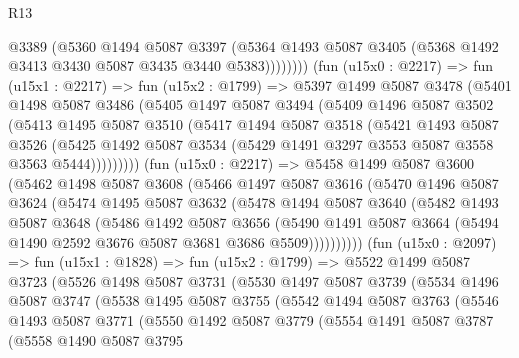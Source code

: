 \begin{lexlean}{R13}
\begin{coremodule}
              @3389
              (@5360
                @1494
                @5087
                @3397
                (@5364 @1493 @5087 @3405 (@5368 @1492 @3413 @3430 @5087 @3435 @3440 @5383))))))))
    (fun (u15x0 : @2217) =>
    fun (u15x1 : @2217) =>
    fun (u15x2 : @1799) =>
    @5397
      @1499
      @5087
      @3478
      (@5401
        @1498
        @5087
        @3486
        (@5405
          @1497
          @5087
          @3494
          (@5409
            @1496
            @5087
            @3502
            (@5413
              @1495
              @5087
              @3510
              (@5417
                @1494
                @5087
                @3518
                (@5421
                  @1493
                  @5087
                  @3526
                  (@5425 @1492 @5087 @3534 (@5429 @1491 @3297 @3553 @5087 @3558 @3563 @5444)))))))))
    (fun (u15x0 : @2217) =>
    @5458
      @1499
      @5087
      @3600
      (@5462
        @1498
        @5087
        @3608
        (@5466
          @1497
          @5087
          @3616
          (@5470
            @1496
            @5087
            @3624
            (@5474
              @1495
              @5087
              @3632
              (@5478
                @1494
                @5087
                @3640
                (@5482
                  @1493
                  @5087
                  @3648
                  (@5486
                    @1492
                    @5087
                    @3656
                    (@5490
                      @1491
                      @5087
                      @3664
                      (@5494 @1490 @2592 @3676 @5087 @3681 @3686 @5509))))))))))
    (fun (u15x0 : @2097) =>
    fun (u15x1 : @1828) =>
    fun (u15x2 : @1799) =>
    @5522
      @1499
      @5087
      @3723
      (@5526
        @1498
        @5087
        @3731
        (@5530
          @1497
          @5087
          @3739
          (@5534
            @1496
            @5087
            @3747
            (@5538
              @1495
              @5087
              @3755
              (@5542
                @1494
                @5087
                @3763
                (@5546
                  @1493
                  @5087
                  @3771
                  (@5550
                    @1492
                    @5087
                    @3779
                    (@5554
                      @1491
                      @5087
                      @3787
                      (@5558
                        @1490
                        @5087
                        @3795

\end{coremodule}
\end{lexlean}
